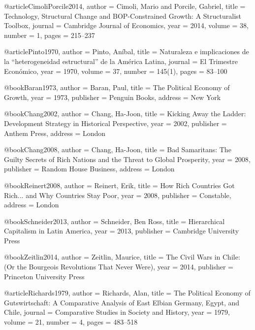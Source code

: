 @article{CimoliPorcile2014,
	author  = {Cimoli, Mario and Porcile, Gabriel},
	title   = {Technology, Structural Change and {BOP}-Constrained Growth: A Structuralist Toolbox},
	journal = {Cambridge Journal of Economics},
	year    = {2014},
	volume  = {38},
	number  = {1},
	pages   = {215--237}
}

@article{Pinto1970,
	author  = {Pinto, An{\'i}bal},
	title   = {Naturaleza e implicaciones de la ``heterogeneidad estructural'' de la {Am{\'e}rica Latina}},
	journal = {El Trimestre Econ{\'o}mico},
	year    = {1970},
	volume  = {37},
	number  = {145(1)},
	pages   = {83--100}
}

@book{Baran1973,
	author    = {Baran, Paul},
	title     = {The Political Economy of Growth},
	year      = {1973},
	publisher = {Penguin Books},
	address   = {New York}
}

@book{Chang2002,
	author    = {Chang, Ha-Joon},
	title     = {Kicking Away the Ladder: Development Strategy in Historical Perspective},
	year      = {2002},
	publisher = {Anthem Press},
	address   = {London}
}

@book{Chang2008,
	author    = {Chang, Ha-Joon},
	title     = {Bad Samaritans: The Guilty Secrets of Rich Nations and the Threat to Global Prosperity},
	year      = {2008},
	publisher = {Random House Business},
	address   = {London}
}

@book{Reinert2008,
	author    = {Reinert, Erik},
	title     = {How Rich Countries Got Rich... and Why Countries Stay Poor},
	year      = {2008},
	publisher = {Constable},
	address   = {London}
}

@book{Schneider2013,
	author    = {Schneider, Ben Ross},
	title     = {Hierarchical Capitalism in {Latin America}},
	year      = {2013},
	publisher = {Cambridge University Press}
}



@book{Zeitlin2014,
	author    = {Zeitlin, Maurice},
	title     = {The Civil Wars in {Chile}: (Or the Bourgeois Revolutions That Never Were)},
	year      = {2014},
	publisher = {Princeton University Press}
}

@article{Richards1979,
	author  = {Richards, Alan},
	title   = {The Political Economy of {Gutswirtschaft}: A Comparative Analysis of {East Elbian Germany}, {Egypt}, and {Chile}},
	journal = {Comparative Studies in Society and History},
	year    = {1979},
	volume  = {21},
	number  = {4},
	pages   = {483--518}
}

